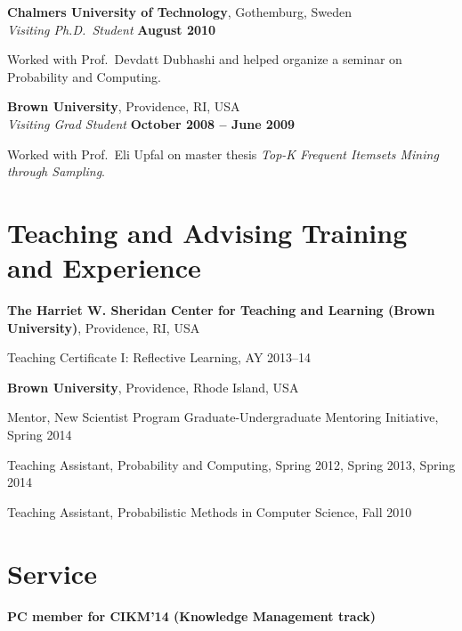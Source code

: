 \documentclass[margin,line]{resume}
\begin{document}
{\bf Chalmers University of Technology}, Gothemburg, Sweden\\
{\em Visiting Ph.D.~Student} \hfill {\bf August 2010}

\begin{list2}
\vspace*{.05in}
\item Worked with Prof.~Devdatt Dubhashi and helped organize a seminar on Probability and Computing.
\end{list2}

{\bf Brown University}, Providence, RI, USA\\
{\em Visiting Grad Student} \hfill {\bf October 2008 -- June 2009}

\begin{list2}
\vspace*{.05in}
\item Worked with Prof.~Eli Upfal on master thesis \textit{Top-K Frequent
  Itemsets Mining through Sampling}.
\end{list2}

\section{\sc Teaching and Advising Training and Experience}
{\bf The Harriet W. Sheridan Center for Teaching and Learning (Brown
University)}, Providence, RI, USA
\begin{list2}
\vspace*{.05in}
\item Teaching Certificate I: Reflective Learning, AY 2013--14
\end{list2}

{\bf Brown University}, Providence, Rhode Island, USA

\begin{list2}
\vspace*{.05in}
\item Mentor, New Scientist Program Graduate-Undergraduate Mentoring Initiative, Spring 2014
\item Teaching Assistant, Probability and Computing, Spring 2012, Spring 2013, Spring 2014
\item Teaching Assistant, Probabilistic Methods in Computer Science, Fall 2010 
\end{list2}

\section{\sc Service}
{\bf PC member for CIKM'14 (Knowledge Management track) }
\end{document}
